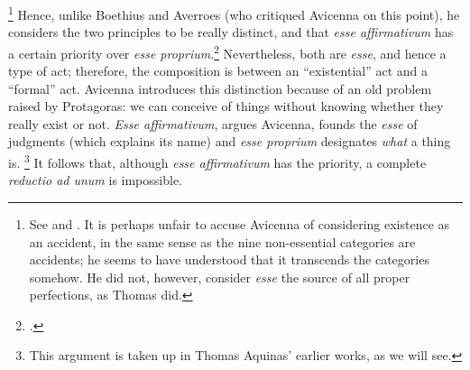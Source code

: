 \footnote{See \cite[190-192]{gilson:history} and \cite[68]{gilson:letre}. It is perhaps unfair to accuse Avicenna of considering existence as an accident, in the same sense as the nine non-essential categories are accidents; he seems to have understood that it transcends the categories somehow. He did not, however, consider \emph{esse} the source of all proper perfections, as Thomas did.} Hence, unlike Boethius and Averroes (who critiqued Avicenna on this point), he considers the two principles to be really distinct, and that \emph{esse affirmativum} has a certain priority over \emph{esse proprium}.\footcite[See][191]{gilson:history} Nevertheless, both are \emph{esse}, and hence a type of act; therefore, the composition is between an “existential” act and a “formal” act. Avicenna introduces this distinction because of an old problem raised by Protagoras: we can conceive of things without knowing whether they really exist or not. \emph{Esse affirmativum}, argues Avicenna, founds the \emph{esse} of judgments (which explains its name) and \emph{esse proprium} designates \emph{what} a thing is.%
%
\footnote{This argument is taken up in Thomas Aquinas’ earlier works, as we will see.} It follows that, although \emph{esse affirmativum} has the priority, a complete \emph{reductio ad unum} is impossible.

